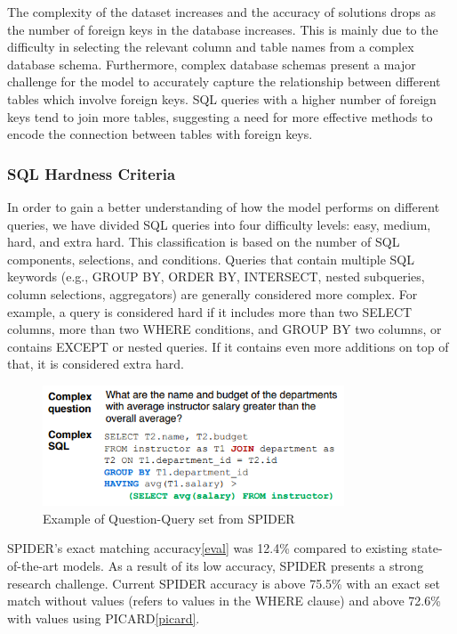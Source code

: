 The complexity of the dataset increases and the accuracy of solutions drops as the number of foreign keys in the database increases. This is mainly due to the difficulty in selecting the relevant column and table names from a complex database schema. Furthermore, complex database schemas present a major challenge for the model to accurately capture the relationship between different tables which involve foreign keys. SQL queries with a higher number of foreign keys tend to join more tables, suggesting a need for more effective methods to encode the connection between tables with foreign keys.

\subsubsection*{SQL Hardness Criteria}

In order to gain a better understanding of how the model performs on different queries, we have divided SQL queries into four difficulty levels: easy, medium, hard, and extra hard. This classification is based on the number of SQL components, selections, and conditions. Queries that contain multiple SQL keywords (e.g., GROUP BY, ORDER BY, INTERSECT, nested subqueries, column selections, aggregators) are generally considered more complex. For example, a query is considered hard if it includes more than two SELECT columns, more than two WHERE conditions, and GROUP BY two columns, or contains EXCEPT or nested queries. If it contains even more additions on top of that, it is considered extra hard.

\begin{figure}[htb]
    \centering
    \includegraphics[width=0.8\textwidth]{pics/db/Spider2.png}
    \caption{Example of Question-Query set from SPIDER\cite{yu_spider_2019}}
    \label{fig:Spider2}
\end{figure}


SPIDER's exact matching accuracy\ref{eval} was 12.4\% compared to existing state-of-the-art models. As a result of its low accuracy, SPIDER presents a strong research challenge. Current SPIDER accuracy is above 75.5\% with an exact set match without values (refers to values in the WHERE clause) and above 72.6\% with values using PICARD\ref{picard}.

